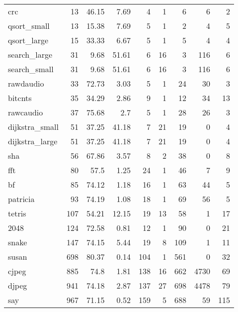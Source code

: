 \begin{tabular}{lrrrrrrrr}
\hline
 crc            &       13 &    46.15 &   7.69 &    4 &    1 &      6 &     6 &     2 \\
 qsort\_small    &       13 &    15.38 &   7.69 &    5 &    1 &      2 &     4 &     5 \\
 qsort\_large    &       15 &    33.33 &   6.67 &    5 &    1 &      5 &     4 &     4 \\
 search\_large   &       31 &     9.68 &  51.61 &    6 &   16 &      3 &   116 &     6 \\
 search\_small   &       31 &     9.68 &  51.61 &    6 &   16 &      3 &   116 &     6 \\
 rawdaudio      &       33 &    72.73 &   3.03 &    5 &    1 &     24 &    30 &     3 \\
 bitcnts        &       35 &    34.29 &   2.86 &    9 &    1 &     12 &    34 &    13 \\
 rawcaudio      &       37 &    75.68 &   2.7  &    5 &    1 &     28 &    26 &     3 \\
 dijkstra\_small &       51 &    37.25 &  41.18 &    7 &   21 &     19 &     0 &     4 \\
 dijkstra\_large &       51 &    37.25 &  41.18 &    7 &   21 &     19 &     0 &     4 \\
 sha            &       56 &    67.86 &   3.57 &    8 &    2 &     38 &     0 &     8 \\
 fft            &       80 &    57.5  &   1.25 &   24 &    1 &     46 &     7 &     9 \\
 bf             &       85 &    74.12 &   1.18 &   16 &    1 &     63 &    44 &     5 \\
 patricia       &       93 &    74.19 &   1.08 &   18 &    1 &     69 &    56 &     5 \\
 tetris         &      107 &    54.21 &  12.15 &   19 &   13 &     58 &     1 &    17 \\
 2048           &      124 &    72.58 &   0.81 &   12 &    1 &     90 &     0 &    21 \\
 snake          &      147 &    74.15 &   5.44 &   19 &    8 &    109 &     1 &    11 \\
 susan          &      698 &    80.37 &   0.14 &  104 &    1 &    561 &     0 &    32 \\
 cjpeg          &      885 &    74.8  &   1.81 &  138 &   16 &    662 &  4730 &    69 \\
 djpeg          &      941 &    74.18 &   2.87 &  137 &   27 &    698 &  4478 &    79 \\
 say            &      967 &    71.15 &   0.52 &  159 &    5 &    688 &    59 &   115 \\

\end{tabular}
